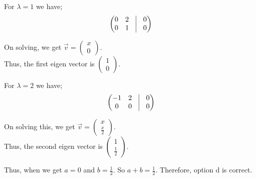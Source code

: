 \documentclass{beamer}
\theoremstyle{remark}
\newcommand{\myvec}[1]{\ensuremath{\begin{pmatrix}#1\end{pmatrix}}}
\numberwithin{equation}{section}
\begin{document}
\begin{frame}
For $\lambda=1$ we have;
\begin{align}
\myvec{0 & 2 & \vline & 0 \\ 0 & 1 & \vline & 0}
\end{align}

On solving, we get $\Vec{v}=\myvec{x \\ 0}$. \\
Thus, the first eigen vector is $\myvec{1 \\ 0}$.

For $\lambda=2$ we have;
\begin{align}
\myvec{-1 & 2 & \vline & 0 \\ 0 & 0 & \vline & 0}
\end{align}

On solving this, we get $\Vec{v}=\myvec{x \\ \frac{x}{2}}$. \\
Thus, the second eigen vector is $\myvec{1 \\ \frac{1}{2}}$.
\end{frame}

\begin{frame}
Thus, when we get $a=0$ and $b=\frac{1}{2}$. So $a+b=\frac{1}{2}$.
Therefore, option d is correct.
\end{frame}
\end{document}
